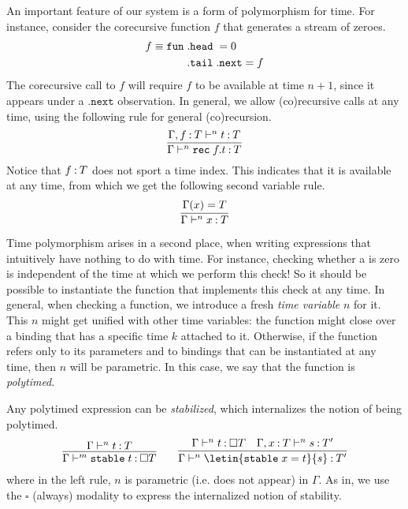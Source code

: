 \documentclass[acmsmall, natbib=false]{acmart}
\newcommand{\fun}{\mathtt{fun}}
\newcommand{\always}{\square}
\renewcommand{\next}{\mathtt{.next}}
\newcommand{\stable}{\mathtt{stable}}
\begin{document}
An important feature of our system is a form of polymorphism for time.
%
For instance, consider the corecursive function $f$ that generates a stream of
zeroes.
%
\begin{align*}
  f \equiv \; & \fun\; \mathtt{.head}\; = 0 \\
  &\hphantom{\fun\;} \mathtt{.tail}\; \next = f
\end{align*}
%
The corecursive call to $f$ will require $f$ to be available at time $n + 1$,
since it appears under a $\next$ observation.
%
In general, we allow (co)recursive calls at any time, using the following rule
for general (co)recursion.
%
\begin{equation*}
  \infer{
    \Gamma \proves^n \mathtt{rec}\; f. t \hastype T
  }{
    \Gamma, f \hastype T \proves^n t \hastype T
  }
\end{equation*}
%
Notice that $f \mathbin{:} T$ does not sport a time index.
This indicates that it is available at any time, from which we get the
following second variable rule.
%
\begin{equation*}
  \infer{
    \Gamma \proves^n x \hastype T
  }{
    \Gamma(x) = T
  }
\end{equation*}

Time polymorphism arises in a second place, when writing expressions that
intuitively have nothing to do with time.
For instance, checking whether a  is zero is independent of the
time at which we perform this check!
So it should be possible to instantiate the function that implements this check
at any time.
In general, when checking a function, we introduce a fresh \emph{time variable}
$n$ for it.
This $n$ might get unified with other time variables: the function might close
over a binding that has a specific time $k$ attached to it.
Otherwise, if the function refers only to its parameters and to bindings that
can be instantiated at any time, then $n$ will be parametric.
In this case, we say that the function is \emph{polytimed}.

Any polytimed expression can be \emph{stabilized}, which internalizes the
notion of being polytimed.
%
\begin{equation*}
  \infer{
    \Gamma \proves^m \stable\; t \hastype \always T
  }{
    \Gamma \proves^n t \hastype T
  }
  \quad
  \quad
  \infer{
    \Gamma \proves^n \letin{\mathtt{stable}\;x = t}{s} \hastype T^\prime
  }{
    \Gamma \proves^n t \hastype \always T
    &
    \Gamma, x \hastype T \proves^n s \hastype T^\prime
  }
\end{equation*}
%
where in the left rule, $n$ is parametric (i.e. does not appear) in $\Gamma$.
As in\cite{neelk1}, we use the $\always$ (always) modality to express the
internalized notion of stability.
\end{document}
